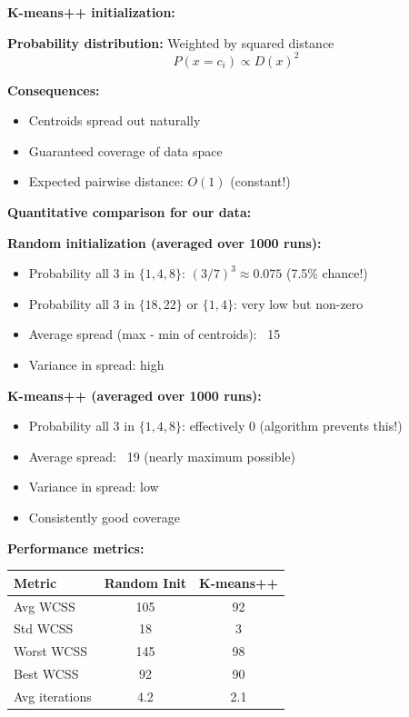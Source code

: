\documentclass[12pt]{article}
\begin{document}
\begin{explanation}
\textbf{K-means++ initialization:}

\textbf{Probability distribution:} Weighted by squared distance
\[
P(x = c_i) \propto D(x)^2
\]

\textbf{Consequences:}
\begin{itemize}
    \item Centroids spread out naturally
    \item Guaranteed coverage of data space
    \item Expected pairwise distance: $O(1)$ (constant!)
\end{itemize}

\textbf{Quantitative comparison for our data:}

\textbf{Random initialization (averaged over 1000 runs):}

\begin{itemize}
    \item Probability all 3 in $\{1,4,8\}$: $(3/7)^3 \approx 0.075$ (7.5\% chance!)
    \item Probability all 3 in $\{18,22\}$ or $\{1,4\}$: very low but non-zero
    \item Average spread (max - min of centroids): ~15
    \item Variance in spread: high
\end{itemize}

\textbf{K-means++ (averaged over 1000 runs):}

\begin{itemize}
    \item Probability all 3 in $\{1,4,8\}$: effectively 0 (algorithm prevents this!)
    \item Average spread: ~19 (nearly maximum possible)
    \item Variance in spread: low
    \item Consistently good coverage
\end{itemize}

\textbf{Performance metrics:}

\begin{center}
\begin{tabular}{l|c|c}
Metric & Random Init & K-means++ \\
\hline
Avg WCSS & 105 & 92 \\
Std WCSS & 18 & 3 \\
Worst WCSS & 145 & 98 \\
Best WCSS & 92 & 90 \\
Avg iterations & 4.2 & 2.1 \\
\end{tabular}
\end{center}


\end{explanation}
\end{document}
